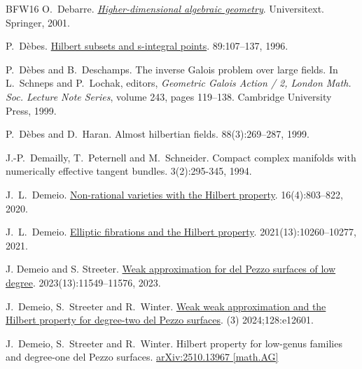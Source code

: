 \documentclass[10pt,a4paper]{amsart}
\theoremstyle{plain}
\theoremstyle{remark}
\numberwithin{theorem}{section}
\begin{document}
\begin{thebibliography}{BFW16}
O.~Debarre.
\newblock \href{https://doi.org/10.1007/978-1-4757-5406-3}{{\em Higher-dimensional algebraic geometry}}.  
\newblock Universitext. Springer, 2001.   

P.~D\`ebes. 
\newblock \href{https://doi.org/10.1007/BF02567509}{Hilbert subsets and s-integral points}. 
 89:107--137, 1996. 

P.~D\`ebes and B.~Deschamps.
\newblock The inverse {G}alois problem over large fields.
\newblock In L.~Schneps and P.~Lochak, editors, {\em Geometric Galois Action /
  2, London Math. Soc. Lecture Note Series}, volume 243, pages 119--138.
  Cambridge University Press, 1999.

P.~D\`ebes and D.~Haran.
\newblock Almost hilbertian fields.
 88(3):269--287, 1999.

J.-P.~Demailly, T.~Peternell and M.~Schneider. 
\newblock Compact complex manifolds with numerically effective tangent bundles. 
 3(2):295-345, 1994.
  
J.~L.~Demeio.
\newblock \href{https://doi.org/10.1142/S1793042120500414}{Non-rational varieties with the Hilbert property}.
 16(4):803--822, 2020.

J.~L.~Demeio.
\newblock \href{https://doi.org/10.1093/imrn/rnz108}{Elliptic fibrations and the Hilbert property}.
 2021(13):10260--10277, 2021.

J. Demeio and S. Streeter.
\newblock \href{http://dx.doi.org/10.1093/imrn/rnac167}{Weak approximation for del Pezzo surfaces of low degree}. 
 2023(13):11549--11576, 2023.

J.~Demeio, S.~Streeter and R.~Winter.
\newblock \href{https://doi.org/10.1112/plms.12601}{Weak weak approximation and the Hilbert property for degree-two del Pezzo surfaces}. 
 (3) 2024;128:e12601. 

J.~Demeio, S.~Streeter and R.~Winter.
\newblock Hilbert property for low-genus families and degree-one del Pezzo surfaces.
\newblock \href{https://doi.org/10.48550/arXiv.2510.13967}{arXiv:2510.13967 [math.AG]}


\end{thebibliography}
\end{document}
